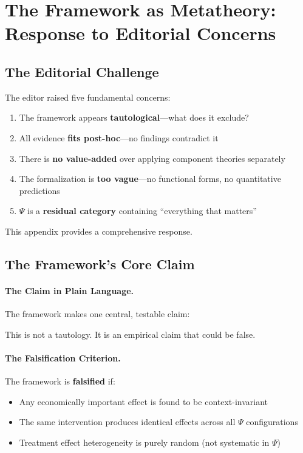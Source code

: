 \section{The Framework as Metatheory: Response to Editorial Concerns}
\label{app:metatheory}

\subsection{The Editorial Challenge}

The editor raised five fundamental concerns:
\begin{enumerate}
    \item The framework appears \textbf{tautological}---what does it exclude?
    \item All evidence \textbf{fits post-hoc}---no findings contradict it
    \item There is \textbf{no value-added} over applying component theories separately
    \item The formalization is \textbf{too vague}---no functional forms, no quantitative predictions
    \item $\Psi$ is a \textbf{residual category} containing ``everything that matters''
\end{enumerate}

This appendix provides a comprehensive response.

\subsection{The Framework's Core Claim}

\paragraph{The Claim in Plain Language.}
The framework makes one central, testable claim:

\begin{center}
\end{center}

This is not a tautology. It is an empirical claim that could be false.

\paragraph{The Falsification Criterion.}
The framework is \textbf{falsified} if:
\begin{itemize}
    \item Any economically important effect is found to be context-invariant
    \item The same intervention produces identical effects across all $\Psi$ configurations
    \item Treatment effect heterogeneity is purely random (not systematic in $\Psi$)
\end{itemize}

